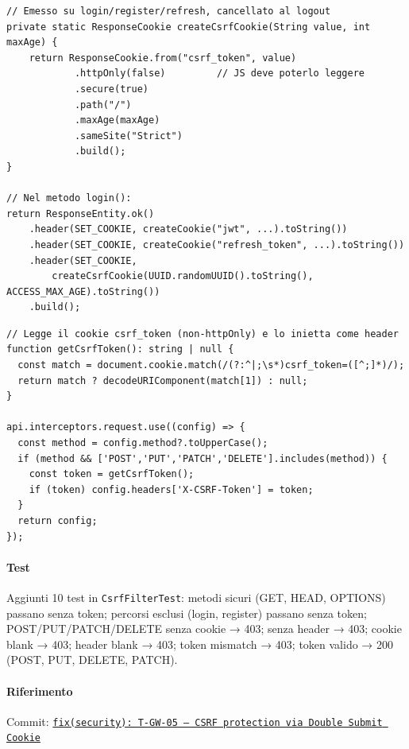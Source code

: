 ﻿\documentclass[a4paper,12pt]{report}
\newcommand{\commitref}[2]{\texttt{\small \href{https://github.com/diegoandruccioli/hotel-pms/commit/#1}{#2}}}
\begin{document}
\begin{securebox}[title={Codice Sicuro --- AuthController.java (auth-service): emissione csrf\_token}]
\begin{lstlisting}[style=java]
// Emesso su login/register/refresh, cancellato al logout
private static ResponseCookie createCsrfCookie(String value, int maxAge) {
    return ResponseCookie.from("csrf_token", value)
            .httpOnly(false)         // JS deve poterlo leggere
            .secure(true)
            .path("/")
            .maxAge(maxAge)
            .sameSite("Strict")
            .build();
}

// Nel metodo login():
return ResponseEntity.ok()
    .header(SET_COOKIE, createCookie("jwt", ...).toString())
    .header(SET_COOKIE, createCookie("refresh_token", ...).toString())
    .header(SET_COOKIE,
        createCsrfCookie(UUID.randomUUID().toString(), ACCESS_MAX_AGE).toString())
    .build();
\end{lstlisting}
\end{securebox}

\begin{securebox}[title={Codice Sicuro --- api.ts (frontend): Axios request interceptor}]
\begin{lstlisting}[style=typescript]
// Legge il cookie csrf_token (non-httpOnly) e lo inietta come header
function getCsrfToken(): string | null {
  const match = document.cookie.match(/(?:^|;\s*)csrf_token=([^;]*)/);
  return match ? decodeURIComponent(match[1]) : null;
}

api.interceptors.request.use((config) => {
  const method = config.method?.toUpperCase();
  if (method && ['POST','PUT','PATCH','DELETE'].includes(method)) {
    const token = getCsrfToken();
    if (token) config.headers['X-CSRF-Token'] = token;
  }
  return config;
});
\end{lstlisting}
\end{securebox}

\paragraph{Test} Aggiunti 10 test in \texttt{CsrfFilterTest}:
metodi sicuri (GET, HEAD, OPTIONS) passano senza token; percorsi esclusi (login, register) passano senza token;
POST/PUT/PATCH/DELETE senza cookie → 403; senza header → 403; cookie blank → 403; header blank → 403;
token mismatch → 403; token valido → 200 (POST, PUT, DELETE, PATCH).

\paragraph{Riferimento} Commit: \commitref{e146b17}{fix(security): T-GW-05 --- CSRF protection via Double Submit Cookie}
\end{document}
